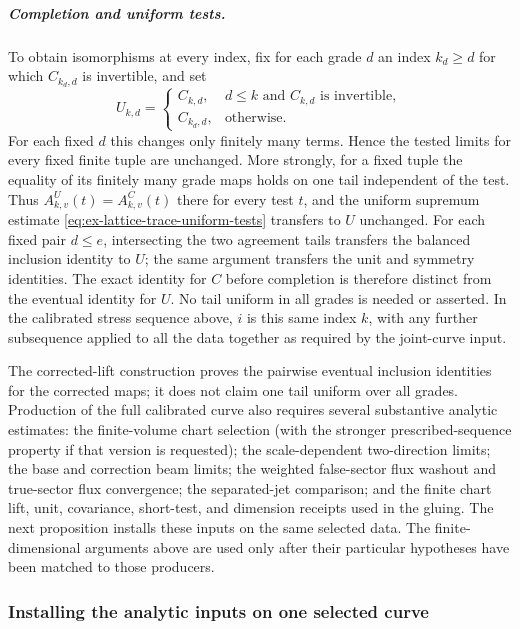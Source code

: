 \subparagraph{Completion and uniform tests.}
\label{par:ex-trace-completed-uniform-tests}
To obtain isomorphisms at every index, fix for each grade $d$ an index
$k_d\ge d$ for which $C_{k_d,d}$ is invertible, and set
\[
 U_{k,d}=\begin{cases}
 C_{k,d},&d\le k\text{ and }C_{k,d}\text{ is invertible},\\
 C_{k_d,d},&\text{otherwise}.
 \end{cases}
\]
For each fixed $d$ this changes only finitely many terms. Hence the tested
limits for every fixed finite tuple are unchanged. More strongly, for a
fixed tuple the equality of its finitely many grade maps holds on one
tail independent of the test. Thus $A^U_{k,v}(t)=A^C_{k,v}(t)$ there
for every test $t$, and the uniform supremum estimate
\eqref{eq:ex-lattice-trace-uniform-tests} transfers to $U$ unchanged.
For each fixed pair
$d\le e$, intersecting the two agreement tails transfers the balanced
inclusion identity to $U$; the same argument transfers the unit and
symmetry identities. The exact identity for $C$ before completion is
therefore distinct from the eventual identity for $U$. No tail uniform in
all grades is needed or asserted. In the calibrated stress sequence above,
$i$ is this same index $k$, with any further subsequence applied to all the
data together as required by the joint-curve input.

The corrected-lift construction proves the pairwise eventual inclusion
identities for the corrected maps; it does not claim one tail uniform over
all grades. Production of the full calibrated curve also requires several
substantive analytic estimates: the finite-volume chart selection (with
the stronger prescribed-sequence property if that version is requested); the scale-dependent two-direction limits;
the base and correction beam limits; the weighted false-sector flux
washout and true-sector flux convergence; the separated-jet comparison;
and the finite chart lift, unit, covariance, short-test, and dimension
receipts used in the gluing. The next proposition installs these inputs on the same selected data.
The finite-dimensional arguments above are used only after their particular
hypotheses have been matched to those producers.

\subsubsection{Installing the analytic inputs on one selected curve}

